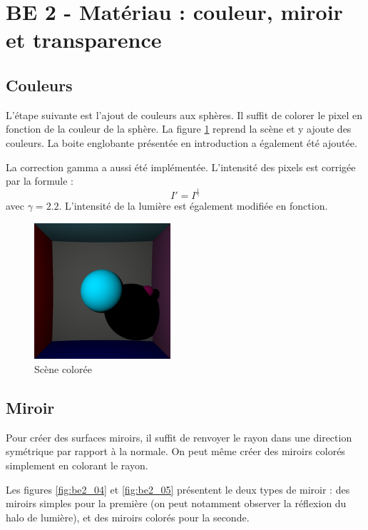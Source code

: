 \documentclass[12pt,a4paper,twoside]{report}
\begin{document}
\newpage\section{BE 2 - Matériau : couleur, miroir et transparence}
\subsection{Couleurs}
L'étape suivante est l'ajout de couleurs aux sphères. Il suffit de colorer le pixel en fonction de la couleur de la sphère. La figure \ref{fig:be2_03} reprend la scène et y ajoute des couleurs. La boite englobante présentée en introduction a également été ajoutée.

La correction gamma a aussi été implémentée. L'intensité des pixels est corrigée par la formule :
\begin{equation}
	I' = I^\frac{1}{\gamma}
\end{equation}
avec $\gamma = 2.2$. L'intensité de la lumière est également modifiée en fonction.

\begin{figure}[H]
	\centering
	\includegraphics[width=0.45\textwidth]{be2_03}
	\caption{Scène colorée}
	\label{fig:be2_03}
\end{figure}

\subsection{Miroir}
Pour créer des surfaces miroirs, il suffit de renvoyer le rayon dans une direction symétrique par rapport à la normale. On peut même créer des miroirs colorés simplement en colorant le rayon.

Les figures \ref{fig:be2_04} et \ref{fig:be2_05} présentent le deux types de miroir : des miroirs simples pour la première (on peut notamment observer la réflexion du halo de lumière), et des miroirs colorés pour la seconde.
\end{document}
